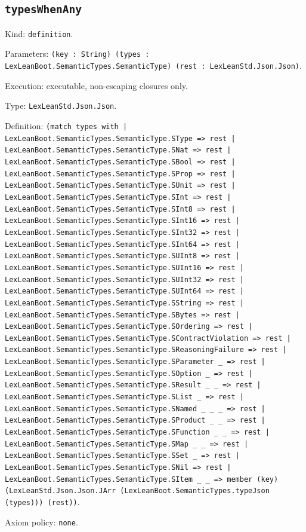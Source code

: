 \documentclass[11pt]{article}
\begin{document}
\subsection*{\texttt{typesWhenAny}}
\noindent Kind: \texttt{definition}.\par
\noindent Parameters: \texttt{(key : String) (types : LexLeanBoot.SemanticTypes.SemanticType) (rest : LexLeanStd.Json.Json)}.\par
\noindent Execution: executable, non-escaping closures only.\par
\noindent Type: \texttt{LexLeanStd.Json.Json}.\par
\noindent Definition: \texttt{(match types with | LexLeanBoot.SemanticTypes.SemanticType.SType => rest | LexLeanBoot.SemanticTypes.SemanticType.SNat => rest | LexLeanBoot.SemanticTypes.SemanticType.SBool => rest | LexLeanBoot.SemanticTypes.SemanticType.SProp => rest | LexLeanBoot.SemanticTypes.SemanticType.SUnit => rest | LexLeanBoot.SemanticTypes.SemanticType.SInt => rest | LexLeanBoot.SemanticTypes.SemanticType.SInt8 => rest | LexLeanBoot.SemanticTypes.SemanticType.SInt16 => rest | LexLeanBoot.SemanticTypes.SemanticType.SInt32 => rest | LexLeanBoot.SemanticTypes.SemanticType.SInt64 => rest | LexLeanBoot.SemanticTypes.SemanticType.SUInt8 => rest | LexLeanBoot.SemanticTypes.SemanticType.SUInt16 => rest | LexLeanBoot.SemanticTypes.SemanticType.SUInt32 => rest | LexLeanBoot.SemanticTypes.SemanticType.SUInt64 => rest | LexLeanBoot.SemanticTypes.SemanticType.SString => rest | LexLeanBoot.SemanticTypes.SemanticType.SBytes => rest | LexLeanBoot.SemanticTypes.SemanticType.SOrdering => rest | LexLeanBoot.SemanticTypes.SemanticType.SContractViolation => rest | LexLeanBoot.SemanticTypes.SemanticType.SReasoningFailure => rest | LexLeanBoot.SemanticTypes.SemanticType.SParameter \_ => rest | LexLeanBoot.SemanticTypes.SemanticType.SOption \_ => rest | LexLeanBoot.SemanticTypes.SemanticType.SResult \_ \_ => rest | LexLeanBoot.SemanticTypes.SemanticType.SList \_ => rest | LexLeanBoot.SemanticTypes.SemanticType.SNamed \_ \_ \_ => rest | LexLeanBoot.SemanticTypes.SemanticType.SProduct \_ \_ => rest | LexLeanBoot.SemanticTypes.SemanticType.SFunction \_ \_ => rest | LexLeanBoot.SemanticTypes.SemanticType.SMap \_ \_ => rest | LexLeanBoot.SemanticTypes.SemanticType.SSet \_ => rest | LexLeanBoot.SemanticTypes.SemanticType.SNil => rest | LexLeanBoot.SemanticTypes.SemanticType.SItem \_ \_ => member (key) (LexLeanStd.Json.Json.JArr (LexLeanBoot.SemanticTypes.typeJson (types))) (rest))}.\par
\noindent Axiom policy: \texttt{none}.\par
\end{document}
